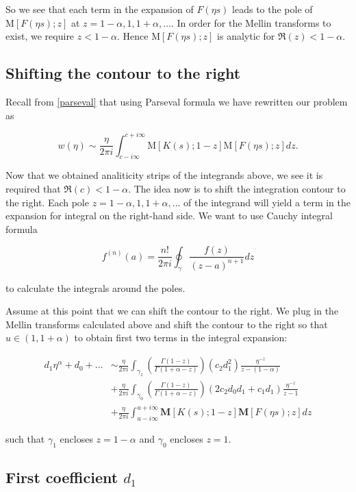 \documentclass[12pt]{article}
\theoremstyle{plain}
\begin{document}
So we see that each term in the expansion of $F(\eta s)$ leads to the pole of $\mathrm{M}[F(\eta s) ; z]$ at $z = 1-\alpha, 1, 1+\alpha, \dots$. In order for the Mellin transforms to exist, we require $z < 1-\alpha$. Hence $\mathrm{M}[F(\eta s) ; z]$ is analytic for $\Re(z) < 1-\alpha$.

\subsection{Shifting the contour to the right}

Recall from \eqref{parseval} that using Parseval formula we have rewritten our problem as

$$
w(\eta) \sim \frac{\eta}{2 \pi i} \int_{c-i \infty}^{c+i \infty} \mathrm{M}[K(s) ; 1-z] \mathrm{M}[F(\eta s) ; z] d z.
$$

Now that we obtained analiticity strips of the integrands above, we see it is required that $\Re (c) < 1 - \alpha$. The idea now is to shift the integration contour to the right. Each pole $z = 1 - \alpha, 1, 1 + \alpha, \dots$ of the integrand will yield a term in the expansion for integral on the right-hand side. We want to use Cauchy integral formula

$$
f^{(n)}(a)=\frac{n !}{2 \pi i} \oint_{\gamma} \frac{f(z)}{(z-a)^{n+1}} d z
$$

to calculate the integrals around the poles.

Assume at this point that we can shift the contour to the right. We plug in the Mellin transforms calculated above and shift the contour to the right so that $u \in (1, 1+\alpha)$ to obtain first two terms in the integral expansion:

$$
\begin{aligned}
d_1 \eta ^\alpha + d_0 + \dots &\sim \frac{\eta}{2 \pi i} \int_{\gamma_1} \left( \frac{\Gamma(1-z)}{\Gamma(1+\alpha-z)}\right) \left(c_{2} d_{1}^{2}\right)  \frac{\eta^{-z}}{z-(1-\alpha)} \\
&+ \frac{\eta}{2 \pi i} \int_{\gamma_0} \left( \frac{\Gamma(1-z)}{\Gamma(1+\alpha-z)}\right) \left(2 c_{2} d_{0} d_{1}+c_{1} d_{1}\right) \frac{\eta^{-z}}{z-1} \\
&+ \frac{\eta}{2 \pi i} \int_{u - i\infty} ^{u + i \infty} \mathbf{M}[K(s) ; 1-z] \mathbf{M}[F(\eta s) ; z] d z
\end{aligned}
$$

such that $\gamma_1$ encloses $z=1-\alpha$ and $\gamma_0$ encloses $z=1$.

\subsection{First coefficient $d_1$}
\end{document}
